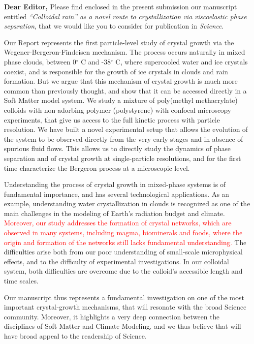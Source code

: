\documentclass[11pt]{article}
\begin{document}
\doublespacing

\noindent
{\bf Dear Editor,}
\vskip 0.3cm
Please find enclosed in the present submission our manuscript entitled
\emph{``Colloidal rain'' as a novel route to crystallization via viscoelastic phase separation},
that we would like you to consider for publication in \emph{Science}.

Our Report represents the first particle-level study of crystal growth via the Wegener-Bergeron-Findeisen mechanism.
The process occurs naturally in mixed phase clouds, between 0$^\circ$ C and -38$^\circ$ C, where supercooled water and ice crystals coexist,
and is responsible for the growth of ice crystals in clouds and rain formation. But we argue that this
mechanism of crystal growth is much more common than previously thought,
and show that it can be accessed directly in a Soft Matter model system.
We study a mixture of poly(methyl methacrylate) colloids with non-adorbing polymer (polystyrene)
with confocal microscopy experiments, that give us access to the full kinetic process with
particle resolution. We have built a novel experimental setup that allows the evolution of
the system to be observed directly from the very early stages and in absence of spurious fluid flows.
This allows us to directly study the dynamics of phase separation and of crystal growth at single-particle resolutions,
and for the first time characterize the Bergeron process at a microscopic level.

Understanding the process of crystal growth in mixed-phase systems is of fundamental importance,
and has several technological applications. As an example, understanding
water crystallization in clouds is recognized as one of the main challenges in the
modeling of Earth's radiation budget and climate. \textcolor{red}{Moreover, our study addresses the formation of crystal networks,
which are observed in many systems, including magma, biominerals and foods, where the origin
and formation of the networks still lacks fundamental understanding.}
The difficulties arise both from our poor understanding of small-scale microphysical effects,
and to the difficulty of experimental investigations. In our colloidal system, both
difficulties are overcome due to the colloid's accessible length and time scales.

Our manuscript thus represents a fundamental investigation on one of the most important
crystal-growth mechanisms, that will resonate with the broad Science community.
Moreover, it highlights a very deep connection between the disciplines of Soft Matter and Climate Modeling,
and we thus believe that will have broad appeal to the readership of Science.
\end{document}
